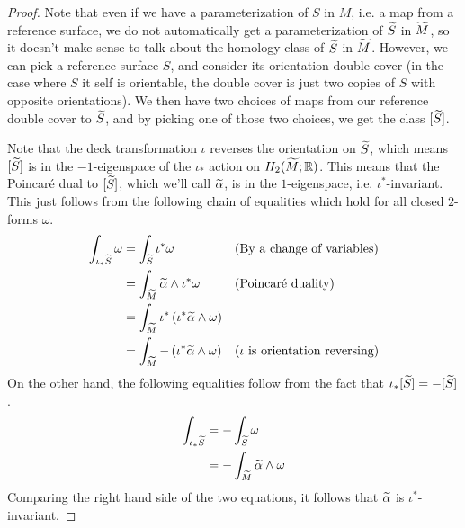 \begin{proof}
  Note that even if we have a parameterization of $S$ in $M$, i.e. a map from a reference surface,
  we do not automatically get a parameterization of $\widetilde{S}$ in $\widetilde{M}$, so it doesn't make sense
  to talk about the homology class of $\widetilde{S}$ in $\widetilde{M}$. However, we can pick a reference
  surface $S$, and consider its orientation double cover (in the case where $S$ it self is
  orientable, the double cover is just two copies of $S$ with opposite orientations). We then
  have two choices of maps from our reference double cover to $\widetilde{S}$, and by picking one of
  those two choices, we get the class $[\widetilde{S}]$.

  Note that the deck transformation $\iota$ reverses the orientation on $\widetilde{S}$, which means
  $[\widetilde{S}]$ is in the $-1$-eigenspace of the $\iota_{\ast}$ action on $H_2(\widetilde{M}; \mathbb{R})$. This
  means that the Poincar\'e dual to $[\widetilde{S}]$, which we'll call $\widetilde{\alpha}$, is in the
  $1$-eigenspace, i.e. $\iota^{\ast}$-invariant. This just follows from the following
  chain of equalities which hold for all closed $2$-forms $\omega$.
  \begin{align*}
    \int_{\iota_{\ast}\widetilde{S}} \omega &= \int_{\widetilde{S}} \iota^{\ast}\omega &&\text{(By a change of variables)} \\
                                     &= \int_{\widetilde{M}} \widetilde{\alpha} \wedge \iota^{\ast} \omega &&\text{(Poincar\'e duality)} \\
                                     &=\int_{\widetilde{M}} \iota^{\ast} \left( \iota^{\ast}\widetilde{\alpha} \wedge \omega \right) \\
    &= \int_{\widetilde{M}} - \left( \iota^{\ast} \widetilde{\alpha} \wedge \omega \right) &&\text{($\iota$ is orientation reversing)}
  \end{align*}
  On the other hand, the following equalities follow from the fact that
  $\iota_{\ast}[\widetilde{S}] = -[\widetilde{S}]$.
  \begin{align*}
    \int_{\iota_{\ast}\widetilde{S}} &= - \int_{\widetilde{S}} \omega \\
                              &= - \int_{\widetilde{M}} \widetilde{\alpha} \wedge \omega
  \end{align*}
  Comparing the right hand side of the two equations, it follows that $\widetilde{\alpha}$ is
  $\iota^{\ast}$-invariant.
\end{proof}

